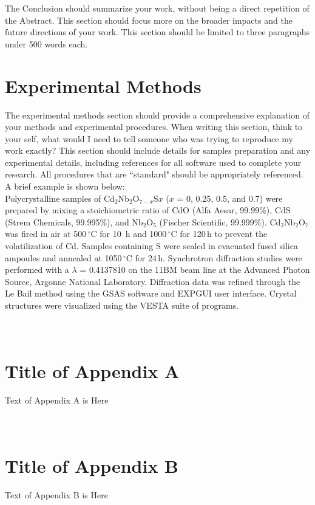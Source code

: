 \documentclass[12pt]{article}
\begin{document}
The Conclusion should summarize your work, without being a direct repetition of the Abstract. This section should focus more on the broader impacts and the future directions of your work. This section should be limited to three paragraphs under 500 words each. 

\section{Experimental Methods}

The experimental methods section should provide a comprehensive explanation of your methods and experimental procedures. When writing this section, think to your self, what would I need to tell someone who was trying to reproduce my work exactly? This section should include details for samples preparation and any experimental details, including references for all software used to complete your research. All procedures that are ``standard" should be appropriately referenced. A brief example is shown below:\\

\noindent 
Polycrystalline samples of Cd$_2$Nb$_2$O$_{7-x}$S$x$ ($x$ = 0, 0.25, 0.5, and 0.7) were prepared by mixing a stoichiometric ratio of CdO (Alfa Aesar, 99.99\%), CdS (Strem Chemicals, 99.995\%), and Nb$_2$O$_5$ (Fischer Scientific, 99.999\%). Cd$_2$Nb$_2$O$_7$ was fired in air at 500\,$^{\circ}$C for 10\, h and 1000\,$^{\circ}$C for 120\,h to prevent the volatilization of Cd. Samples containing S were sealed in evacuated fused silica ampoules and annealed at 1050\,$^{\circ}$C for 24\,h. Synchrotron diffraction studies were performed with a $\lambda$ = 0.4137810 on the 11BM beam line at the Advanced Photon Source, Argonne National Laboratory. Diffraction data was refined through the Le Bail method\cite{LeBail2005} using the GSAS software and EXPGUI user interface.\cite{Larson1994,Toby2001} Crystal structures were visualized using the VESTA suite of programs.\cite{Momma2011}

\pagebreak

\appendix
\section{\\Title of Appendix A}

Text of Appendix A is Here

\section{\\Title of Appendix B}

Text of Appendix B is Here

\pagebreak



\end{document}
